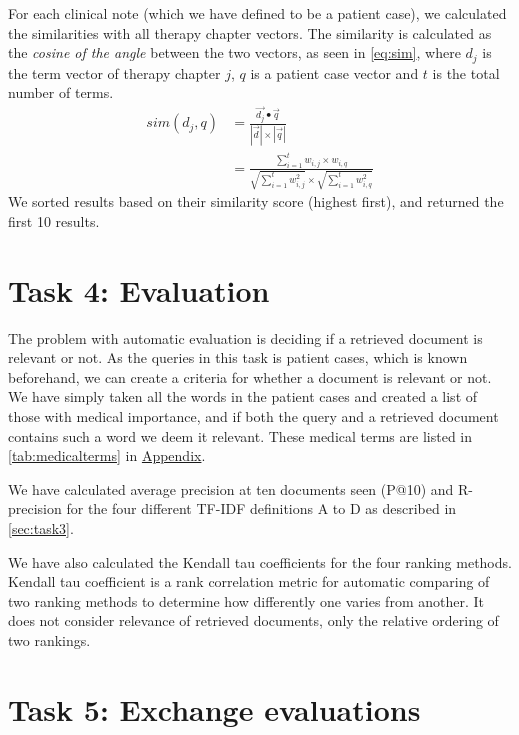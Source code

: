 For each clinical note (which we have defined to be a patient case), we
calculated the similarities with all therapy chapter vectors. The similarity is
calculated as the \emph{cosine of the angle} between the two vectors, as seen
in \autoref{eq:sim}, where \( d_{j} \) is the term vector of therapy chapter \( j \),
\( q \) is a patient case vector and \( t \) is the total number of terms.
\begin{align} \label{eq:sim}
	sim(d_{j}, q) &= \frac{\vec{d_{j}} \bullet \vec{q}}{|\vec{d}| \times |\vec{q}|} \nonumber \\
				  &= \frac{\sum_{i=1}^{t} w_{i,j} \times w_{i,q}}{\sqrt{\sum_{i=1}^{t} w_{i,j}^2} \times \sqrt{\sum_{i=1}^{t} w_{i,q}^2}}
\end{align}
We sorted results based on their similarity score (highest first), and
returned the first 10 results.


\section{Task 4: Evaluation}
\label{sec:task4}
The problem with automatic evaluation is deciding if a retrieved document
is relevant or not. As the queries in this task is patient cases, which is
known beforehand, we can create a criteria for whether a document is relevant
or not. We have simply taken all the words in the patient cases and created a
list of those with medical importance, and if both the query and a retrieved
document contains such a word we deem it relevant. These medical terms are
listed in \autoref{tab:medicalterms} in \hyperref[appendix]{Appendix}.

We have calculated average precision at ten documents seen (P@10) and
R-precision for the four different TF-IDF definitions A to D as described in
\autoref{sec:task3}.

We have also calculated the Kendall tau coefficients for the four ranking
methods. Kendall tau coefficient is a rank correlation metric for automatic
comparing of two ranking methods to determine how differently one varies from
another. It does not consider relevance of retrieved documents, only the
relative ordering of two rankings.


\section{Task 5: Exchange evaluations}



